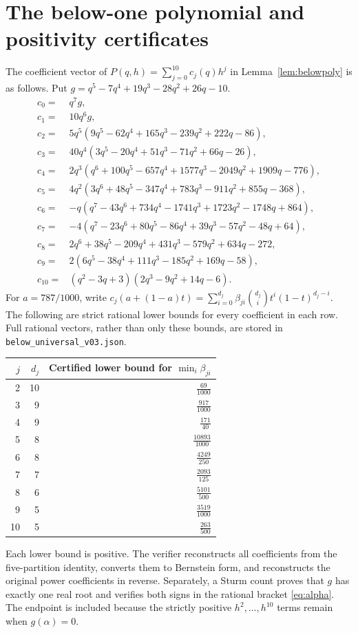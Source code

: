 \documentclass[11pt,a4paper]{article}
\theoremstyle{remark}\newtheorem{remark}[theorem]{Remark}
\begin{document}
\section{The below-one polynomial and positivity certificates}\label{app:belowcoeff}
The coefficient vector of $P(q,h)=\sum_{j=0}^{10}c_j(q)h^j$ in Lemma~\ref{lem:belowpoly} is as follows. Put $g=q^5-7q^4+19q^3-28q^2+26q-10$.
\begin{align*}
c_0={}&q^7g,\\
c_1={}&10q^6g,\\
c_2={}&5q^5(9q^5-62q^4+165q^3-239q^2+222q-86),\\
c_3={}&40q^4(3q^5-20q^4+51q^3-71q^2+66q-26),\\
c_4={}&2q^3(q^6+100q^5-657q^4+1577q^3-2049q^2+1909q-776),\\
c_5={}&4q^2(3q^6+48q^5-347q^4+783q^3-911q^2+855q-368),\\
c_6={}&-q(q^7-43q^6+734q^4-1741q^3+1723q^2-1748q+864),\\
c_7={}&-4(q^7-23q^6+80q^5-86q^4+39q^3-57q^2-48q+64),\\
c_8={}&2q^6+38q^5-209q^4+431q^3-579q^2+634q-272,\\
c_9={}&2(6q^5-38q^4+111q^3-185q^2+169q-58),\\
c_{10}={}&(q^2-3q+3)(2q^3-9q^2+14q-6).
\end{align*}
For $a=787/1000$, write $c_j(a+(1-a)t)=\sum_{i=0}^{d_j}\beta_{ji}\binom{d_j}{i}t^i(1-t)^{d_j-i}$. The following are strict rational lower bounds for every coefficient in each row. Full rational vectors, rather than only these bounds, are stored in \texttt{below\_universal\_v03.json}.
\begingroup\renewcommand{\arraystretch}{1.8}
\begin{center}\begin{tabular}{rrr}
\toprule
$j$&$d_j$&Certified lower bound for $\min_i\beta_{ji}$\\\midrule
2&10&$\frac{69}{1000}$\\
3&9&$\frac{917}{1000}$\\
4&9&$\frac{171}{40}$\\
5&8&$\frac{10893}{1000}$\\
6&8&$\frac{4249}{250}$\\
7&7&$\frac{2093}{125}$\\
8&6&$\frac{5101}{500}$\\
9&5&$\frac{3519}{1000}$\\
10&5&$\frac{263}{500}$\\
\bottomrule\end{tabular}\end{center}\endgroup
Each lower bound is positive. The verifier reconstructs all coefficients from the five-partition identity, converts them to Bernstein form, and reconstructs the original power coefficients in reverse. Separately, a Sturm count proves that $g$ has exactly one real root and verifies both signs in the rational bracket \eqref{eq:alpha}. The endpoint is included because the strictly positive $h^2,\ldots,h^{10}$ terms remain when $g(\alpha)=0$.
\end{document}
